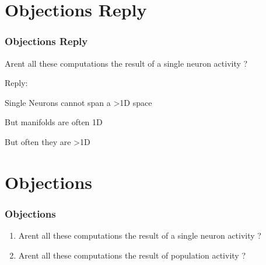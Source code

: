 \documentclass{beamer}
\begin{document}
\section{Objections Reply}
\begin{frame}
\frametitle{\textbf{Objections Reply} }
Arent all these computations the result of a single neuron activity ?

Reply:

Single Neurons cannot span a >1D space

But manifolds are often 1D

But often they are >1D

\end{frame}


\section{Objections}
\begin{frame}
\frametitle{\textbf{Objections} }

\begin{enumerate}
    \item Arent all these computations the result of a single neuron activity ?
    \item Arent all these computations the result of population activity ?
\end{enumerate}



\end{frame}

\end{document}

